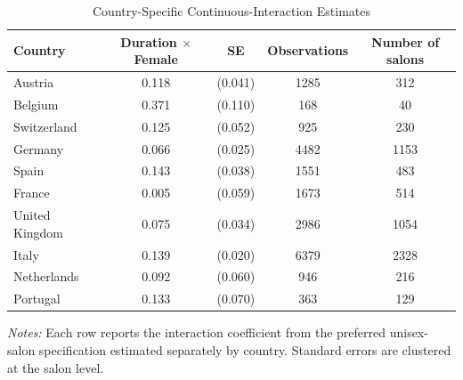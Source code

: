 \begin{table}[htbp]
  \centering
  \caption{Country-Specific Continuous-Interaction Estimates}
  \label{tab:country_heterogeneity}
  \small
  
\begin{tabular}{lcccc}
\hline
Country & Duration $\times$ Female & SE & Observations & Number of salons \\
\hline
Austria & 0.118 & (0.041) & 1285 & 312 \\
Belgium & 0.371 & (0.110) & 168 & 40 \\
Switzerland & 0.125 & (0.052) & 925 & 230 \\
Germany & 0.066 & (0.025) & 4482 & 1153 \\
Spain & 0.143 & (0.038) & 1551 & 483 \\
France & 0.005 & (0.059) & 1673 & 514 \\
United Kingdom & 0.075 & (0.034) & 2986 & 1054 \\
Italy & 0.139 & (0.020) & 6379 & 2328 \\
Netherlands & 0.092 & (0.060) & 946 & 216 \\
Portugal & 0.133 & (0.070) & 363 & 129 \\
\hline
\end{tabular}

\begin{minipage}{0.88\linewidth}
    \footnotesize
    \textit{Notes:} Each row reports the interaction coefficient from the preferred unisex-salon specification estimated separately by country.
    Standard errors are clustered at the salon level.
\end{minipage}
\end{table}
